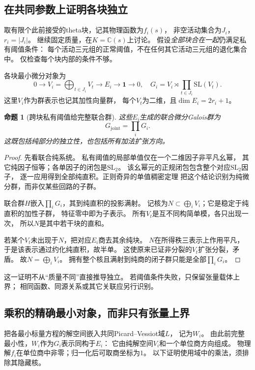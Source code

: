 \documentclass[11pt,a4paper]{ctexart}
\theoremstyle{cnplain}\newtheorem{theorem}{定理}[section]
\newtheorem{proposition}[theorem]{命题}
\theoremstyle{definition}\newtheorem{definition}[theorem]{定义}
\theoremstyle{remark}\newtheorem{remark}[theorem]{注}
\begin{document}
\subsection{在共同参数上证明各块独立}
取有限个此前接受的theta块，记其物理函数为$f_i(s)$，
非空活动集合为$J_i$，$r_i=|J_i|$。
继续固定质量，在$K=\mathbb C(s)$上讨论。
假设\emph{全部块合在一起}仍满足私有阈值条件：
每个活动三元组的正常阈值，不在任何其它活动三元组的退化集合中。
仅检查每个块内部的条件不够。

各块最小微分对象为
\[
 0\longrightarrow V_i=\bigoplus_{t\in J_i}V_t
 \longrightarrow E_i\longrightarrow\mathbf1\longrightarrow0,
 \quad
 G_i=V_i\rtimes\prod_{t\in J_i}\mathrm{SL}(V_t).
\]
这里$V_i$作为群表示也记其加性向量群，
每个$V_t$为二维，且$\dim E_i=2r_i+1$。

\begin{proposition}[跨块私有阈值给完整联合群]\label{prop:blockjointgroup}
这些$E_i$生成的联合微分Galois群为
\[
 G_{\mathrm{joint}}=\prod_iG_i.
\]
这既包括纯部分的独立性，也包括所有加法扩张方向。
\end{proposition}
\begin{proof}
先看联合纯系统。
私有阈值的局部单值仅在一个二维因子非平凡幺幂，
其它纯因子恒等；各单因子的闭包是$\mathrm{SL}_2$。
该幺幂元的正规闭包包含整个对应$\mathrm{SL}_2$因子，
逐一应用得到全部纯直积。正则奇异的单值稠密定理
把这个结论识别为纯微分群，而非仅某些回路的子群。

联合群$H$嵌入$\prod_iG_i$，其到纯直积的投影满射。
记核为$N\subset\bigoplus_iV_i$；它是稳定于纯直积的加性子群，
特征零中即为子表示。
所有$V_t$是互不同构简单模，各只出现一次，
所以$N$是其中若干块的直和。

若某个$V_t$未出现于$N$，把对应$E_i$商去其余纯块。
$N$在所得秩三表示上作用平凡，
于是该表示通过约化纯直积，故半单。
这使原来已证非分裂的$V_t$扩张分裂，矛盾。
故$N=\bigoplus_iV_i$。
拥有整个核且满射到纯商的闭子群只能是全部$\prod_iG_i$。
\end{proof}

这一证明不从“质量不同”直接推导独立。
若阈值条件失败，只保留张量载体上界；
相同函数、同源关系或其它关联应另行识别。

\subsection{乘积的精确最小对象，而非只有张量上界}
把各最小标量方程的解空间嵌入共同Picard--Vessiot域$L$，
记为$W_i$。
由此前完整最小性，$W_i$作为$G_i$表示同构于$E_i$：
它由纯解空间$V_i$和一个单位商方向组成。
物理解$f_i$在单位商中非零；归一化后可取商坐标为$1$。
以下证明使用域中的乘法，须排除其隐藏核。
\end{document}
